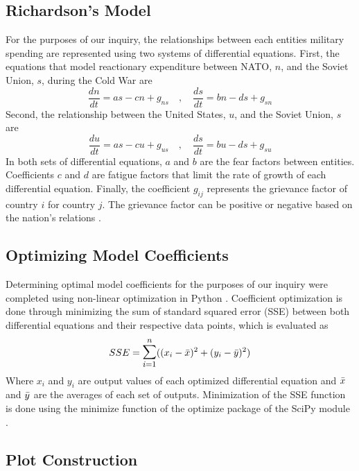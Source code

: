 \documentclass[12pt, centerh1]{article}
\begin{document}
\subsection{Richardson's Model}

For the purposes of our inquiry, the relationships between each entities military spending are represented using two systems of differential equations. First, the equations that model reactionary expenditure between NATO, $n$, and the Soviet Union, $s$, during the Cold War are
\begin{equation*}\label{NS}
    \frac{dn}{dt}= as - cn + g_{ns} \quad ,\quad \frac{ds}{dt} = bn - ds + g_{sn}
\end{equation*}
Second, the relationship between the United States, $u$, and the Soviet Union, $s$ are
\begin{equation*}\label{NS}
    \frac{du}{dt}= as - cu + g_{us} \quad ,\quad \frac{ds}{dt} = bu - ds + g_{su}
\end{equation*}
In both sets of differential equations, $a$ and $b$ are the fear factors between entities. Coefficients $c$ and $d$ are fatigue factors that limit the rate of growth of each differential equation. Finally, the coefficient $g_{ij}$ represents the grievance factor of country $i$ for country $j$. The grievance factor can be positive or negative based on the nation's relations \citep{mooney1999course}.

\subsection{Optimizing Model Coefficients}

Determining optimal model coefficients for the purposes of our inquiry were completed using non-linear optimization in Python \citep{10.5555/1593511}. Coefficient optimization is done through minimizing the sum of standard squared error (SSE) between both differential equations and their respective data points, which is evaluated as
\begin{equation*}\label{NS}
    SSE = \mathlarger{\mathlarger{\sum}}_{i=1}^{n}((x_i-\Bar{x})^2 + (y_i-\Bar{y})^2)
\end{equation*}
Where $x_i$ and $y_i$ are output values of each optimized differential equation and $\Bar{x}$ and $\Bar{y}$ are the averages of each set of outputs. Minimization of the SSE function is done using the minimize function of the optimize package of the SciPy module \citep{2020SciPy-NMeth}. 
\subsection{Plot Construction}
\end{document}
